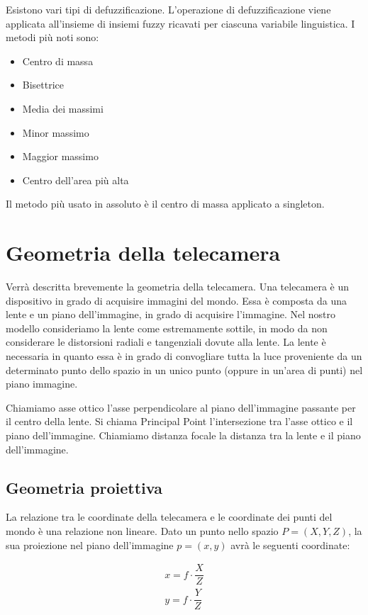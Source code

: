 Esistono vari tipi di defuzzificazione. L'operazione di defuzzificazione viene applicata all'insieme di insiemi fuzzy ricavati per ciascuna variabile linguistica. I metodi più noti sono:
\begin{itemize}
 \item Centro di massa
 \item Bisettrice
 \item Media dei massimi
 \item Minor massimo
 \item Maggior massimo
 \item Centro dell'area più alta
\end{itemize}

Il metodo più usato in assoluto è il centro di massa applicato a singleton.

\section{Geometria della telecamera}

Verrà descritta brevemente la geometria della telecamera.
Una telecamera è un dispositivo in grado di acquisire immagini del mondo. Essa è composta da una lente e un piano dell'immagine, in grado di acquisire l'immagine. Nel nostro modello consideriamo la lente come estremamente sottile, in modo da non considerare le distorsioni radiali e tangenziali dovute alla lente. La lente è necessaria in quanto essa è in grado di convogliare tutta la luce proveniente da un determinato punto dello spazio in un unico punto (oppure in un'area di punti) nel piano immagine.

Chiamiamo asse ottico l'asse perpendicolare al piano dell'immagine passante per il centro della lente. Si chiama Principal Point l'intersezione tra l'asse ottico e il piano dell'immagine.
Chiamiamo distanza focale la distanza tra la lente e il piano dell'immagine.

\subsection{Geometria proiettiva}

La relazione tra le coordinate della telecamera e le coordinate dei punti del mondo è una relazione non lineare.
Dato un punto nello spazio $P=(X,Y,Z)$, la sua proiezione nel piano dell'immagine $p=(x,y)$ avrà le seguenti coordinate:

\begin{equation*}
 \begin{aligned}
  x = f\cdot \dfrac{X}{Z} \\
  y = f\cdot \dfrac{Y}{Z}
 \end{aligned}
\end{equation*}

